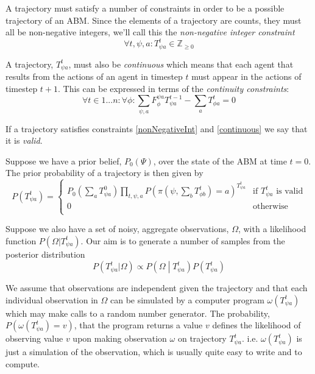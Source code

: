 \documentclass{article}
\begin{document}
A trajectory must satisfy a number of constraints in order to be a possible trajectory of an ABM. Since the elements of a trajectory are counts, they must all be non-negative integers, we'll call this the \textit{non-negative integer constraint}
\begin{equation}
\forall t,\psi, a: T^t_{\psi a} \in \mathbb{Z}_{\ge 0}
\label{nonNegativeInt}
\end{equation}

A trajectory, $T^t_{\psi a}$, must also be \textit{continuous} which means that each agent that results from the actions of an agent in timestep $t$ must appear in the actions of timestep $t+1$. This can be expressed in terms of the \textit{continuity constraints}:
\begin{equation}
\forall t \in 1 ... n:\forall \phi: \sum_{\psi, a} F_\phi^{\psi a}T^{t-1}_{\psi a} - \sum_a T^t_{\phi a} = 0
\label{continuous}
\end{equation}

If a trajectory satisfies constraints \ref{nonNegativeInt} and \ref{continuous} we say that it is \textit{valid}.

Suppose we have a prior belief, $P_0(\Psi)$, over the state of the ABM at time $t=0$. The prior probability of a trajectory is then given by
\[
P(T^t_{\psi a}) =
\begin{cases}
P_0(\sum_aT^0_{\psi a}) \prod_{t, \psi, a} P(\pi(\psi,\sum_bT^{t}_{\phi b})=a)^{T^{t}_{\psi a}} & \text{if } T^t_{\psi a} \text{ is valid} \\
0 & \text{otherwise}\\
\end{cases}
\]

Suppose we also have a set of noisy, aggregate observations, $\Omega$, with a likelihood function $P(\Omega|T^t_{\psi a})$. Our aim is to generate a number of samples from the posterior distribution
\[
P(T^t_{\psi a}|\Omega) \propto P\left(\Omega \middle| T^{t}_{\psi a}\right)P(T^t_{\psi a})
\]

We assume that observations are independent given the trajectory and that each individual observation in $\Omega$ can be simulated by a computer program $\omega(T^t_{\psi a})$ which may make calls to a random number generator. The probability, $P(\omega(T^t_{\psi a}) = v)$, that the program returns a value $v$ defines the likelihood of observing value $v$ upon making observation $\omega$ on trajectory $T^t_{\psi a}$. i.e. $\omega(T^t_{\psi a})$ is just a simulation of the observation, which is usually quite easy to write and to compute. 
\end{document}
